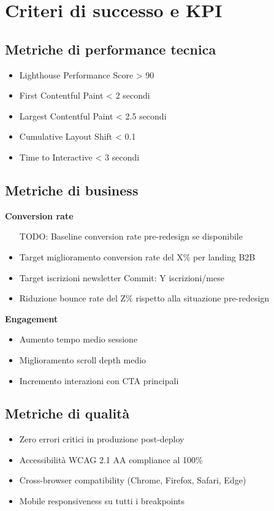 \section{Criteri di successo e KPI}

\subsection{Metriche di performance tecnica}
\begin{itemize}
  \item Lighthouse Performance Score > 90
  \item First Contentful Paint < 2 secondi
  \item Largest Contentful Paint < 2.5 secondi
  \item Cumulative Layout Shift < 0.1
  \item Time to Interactive < 3 secondi
\end{itemize}

\subsection{Metriche di business}
\textbf{Conversion rate}
\begin{itemize}
  \item [TODO: Baseline conversion rate pre-redesign se disponibile]
  \item Target miglioramento conversion rate del X\% per landing B2B
  \item Target iscrizioni newsletter Commit: Y iscrizioni/mese
  \item Riduzione bounce rate del Z\% rispetto alla situazione pre-redesign
\end{itemize}

\textbf{Engagement}
\begin{itemize}
  \item Aumento tempo medio sessione
  \item Miglioramento scroll depth medio
  \item Incremento interazioni con CTA principali
\end{itemize}

\subsection{Metriche di qualità}
\begin{itemize}
  \item Zero errori critici in produzione post-deploy
  \item Accessibilità WCAG 2.1 AA compliance al 100\%
  \item Cross-browser compatibility (Chrome, Firefox, Safari, Edge)
  \item Mobile responsiveness su tutti i breakpoints
\end{itemize}

